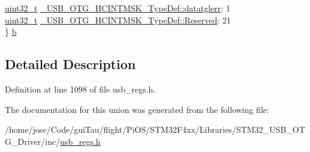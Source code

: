 \begin{DoxyCompactItemize}
\begin{tabbing}
\>\hyperlink{stdint_8h_a435d1572bf3f880d55459d9805097f62}{uint32\_t} \hyperlink{group___u_s_b___o_t_g___d_r_i_v_e_r_gac87753918aa4ff268f9e7ce0a32fb9f0}{\_USB\_OTG\_HCINTMSK\_TypeDef::datatglerr}: 1\\
\>\hyperlink{stdint_8h_a435d1572bf3f880d55459d9805097f62}{uint32\_t} \hyperlink{group___u_s_b___o_t_g___d_r_i_v_e_r_ga561314bd51b64e6b9f40b34dc8944e0b}{\_USB\_OTG\_HCINTMSK\_TypeDef::Reserved}: 21\\
\} \hyperlink{group___u_s_b___o_t_g___d_r_i_v_e_r_ga63e6c6614333e12ec10ef3c0c003ae8f}{b}\\

\end{tabbing}\end{DoxyCompactItemize}


\subsection{Detailed Description}


Definition at line 1098 of file usb\-\_\-regs.\-h.



The documentation for this union was generated from the following file\-:\begin{DoxyCompactItemize}
\item 
/home/jose/\-Code/gui\-Tau/flight/\-Pi\-O\-S/\-S\-T\-M32\-F4xx/\-Libraries/\-S\-T\-M32\-\_\-\-U\-S\-B\-\_\-\-O\-T\-G\-\_\-\-Driver/inc/\hyperlink{_s_t_m32_f4xx_2_libraries_2_s_t_m32___u_s_b___o_t_g___driver_2inc_2usb__regs_8h}{usb\-\_\-regs.\-h}\end{DoxyCompactItemize}

